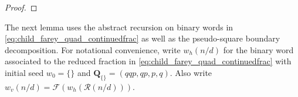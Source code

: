 \documentclass[12pt]{amsart}
\begin{document}
\begin{proof}

%	
%	
%	
\end{proof}




The next lemma uses the abstract recursion on binary words in \eqref{eq:child_farey_quad_continuedfrac} as well as the pseudo-square boundary decomposition. For notational convenience, 
write $w_h(n/d)$ for the binary word associated to the reduced fraction 
in \eqref{eq:child_farey_quad_continuedfrac} with initial seed $w_0 = \{\}$ and $\mathbf{Q}_{\{\}} =(qqp,qp,p,q)$. Also write $w_v(n/d) = \mathcal{F}(w_h( \mathcal{R}(n/d)))$. 
\end{document}
